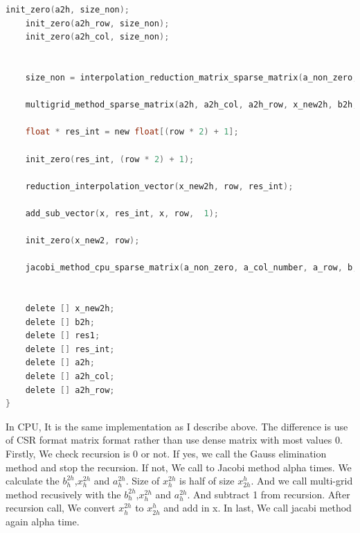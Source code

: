 \begin{lstlisting}[language=C, caption=multigrid method in C++]
    init_zero(a2h, size_non);
    init_zero(a2h_row, size_non);
    init_zero(a2h_col, size_non);


    size_non = interpolation_reduction_matrix_sparse_matrix(a_non_zero, a_col_number, a_row, size_a, row, a2h, a2h_row, a2h_col);

    multigrid_method_sparse_matrix(a2h, a2h_col, a2h_row, x_new2h, b2h, recursion - 1, row / 2, alpha, size_non);

    float * res_int = new float[(row * 2) + 1];

    init_zero(res_int, (row * 2) + 1);

    reduction_interpolation_vector(x_new2h, row, res_int);

    add_sub_vector(x, res_int, x, row,  1);

    init_zero(x_new2, row);

    jacobi_method_cpu_sparse_matrix(a_non_zero, a_col_number, a_row, b, x, x_new2, row, alpha, size_a);


    delete [] x_new2h;
    delete [] b2h;
    delete [] res1;
    delete [] res_int;
    delete [] a2h;
    delete [] a2h_col;
    delete [] a2h_row;
}
\end{lstlisting}

In CPU, It is the same implementation as I describe above. The difference is use of CSR format matrix format rather than use dense matrix with most values 0. Firstly, We check recursion is
0 or not. If yes, we call the Gauss elimination method and stop the recursion. If not,
We call to Jacobi method alpha times. We calculate the $b_h^{2h}$,$x_h^{2h}$  and $a_h^{2h}$. Size of $x_h^{2h}$ is half of size $x_{2h}^h$. And we call multi-grid method recusively with the $b_h^{2h}$,$x_h^{2h}$  and $a_h^{2h}$. And subtract 1 from recursion. After recursion call, We convert $x_h^{2h}$ to $x_{2h}^h$ and add in x. In last, We call jacabi method again alpha time. 


